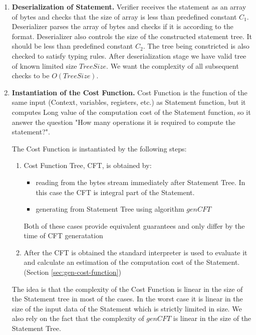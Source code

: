 \documentclass[11pt]{llncs}
\begin{document}
\begin{enumerate}
\item \textbf{Deserialization of Statement.}
Verifier receives the statement as an array of bytes and checks that the size
of array is less than predefined constant $C_1$. Deserializer parses the
array of bytes and checks if it is according to the format. Deserializer also
controls the size of the constructed statement tree. It should be less than
predefined constant $C_2$. The tree being constricted is also checked to
satisfy typing rules. After deserialization stage we have valid tree of known
limited size $TreeSize$. We want the complexity of all subsequent checks to
be $O(TreeSize)$.

\item \textbf{Instantiation of the Cost Function.}
Cost Function is the function of the same input (Context, variables,
registers, etc.) as Statement function, but it computes Long value of the
computation cost of the Statement function, so it answer the question "How
many operations it is required to compute the statement?". 

The Cost Function is instantiated by the following steps:
    \begin{enumerate}
        \item Cost Function Tree, CFT, is obtained by:
        \begin{itemize}
            \item reading from the bytes stream immediately after Statement
            Tree. In this case the CFT is integral part of the Statement.
            \item generating from Statement Tree using algorithm $genCFT$
        \end{itemize}
        Both of these cases provide equivalent guarantees and only differ by
        the time of CFT generatation
        \item After the CFT is obtained the standard interpreter is used to
        evaluate it and calculate an estimation of the computation cost of
        the Statement. (Section \ref{sec:gen-cost-function})
    \end{enumerate}

 The idea is that the complexity of the Cost Function is linear in the size
 of the Statement tree in most of the cases. In the worst case it is linear
 in the size of the input data of the Statement which is strictly limited in
 size.
 We also rely on the fact that the complexity of $genCFT$ is linear in the
 size of the Statement Tree.


\end{enumerate}
\end{document}

